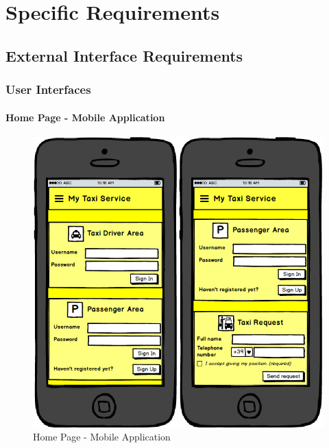 \section{Specific Requirements}
\subsection{External Interface Requirements}
\subsubsection{User Interfaces}
	\paragraph{Home Page - Mobile Application}
	\begin{figure}[!h]
		\begin{center}					
			\includegraphics[scale=0.5]{../SE2_MOCKUPS/MobileAppHomePage.png}
			\caption{Home Page - Mobile Application}
		\end{center}	
	\end{figure}

\newpage

